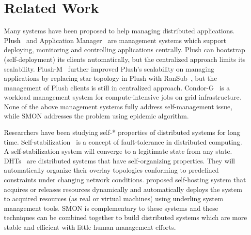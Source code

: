 \section{Related Work}
\label{sec:related}

Many systems have been proposed to help managing distributed
applications. Plush~\cite{Albrecht2007} and Application
Manager~\cite{appmanager} are management systems which
support deploying, monitoring and controlling applications
centrally. Plush can bootstrap (self-deployment) its clients
automatically, but the centralized approach limits its
scalability.  Plush-M~\cite{Topilski2008} further improved
Plush's scalability on managing applications by replacing
star topology in Plush with RanSub~\cite{Kostic2003}, but
the management of Plush clients is still in centralized
approach. Condor-G~\cite{condorg} is a workload management
system for compute-intensive jobs on grid infrastructure.
None of the above management systems fully address
self-management issue, while SMON addresses the problem
using epidemic algorithm.

Researchers have been studying self-* properties of
distributed systems for long time.
Self-stabilization~\cite{Dijkstra1974} is a concept of
fault-tolerance in distributed computing. A
self-stabilization system will converge to a legitimate
state from any state. DHTs~\cite{Stoica2001, Ratnasamy2001,
Rowstron2001} are distributed systems that have
self-organizing properties. They will automatically organize
their overlay topologies conforming to predefined
constraints under changing network conditions.
\cite{Yin2008} proposed self-hosting system that acquires or
releases resources dynamically and automatically deploys the
system to acquired resources (as real or virtual machines)
using underling system management tools. SMON is
complementary to these systems and these techniques can be
combined together to build distributed systems which are
more stable and efficient with little human management
efforts.




